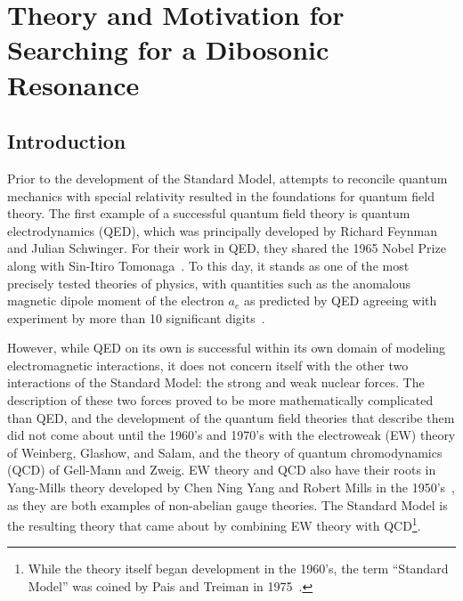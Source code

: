 
\chapter{Theory and Motivation for Searching for a Dibosonic Resonance}
\label{chap:theory}

\section{Introduction}

Prior to the development of the Standard Model, attempts to reconcile quantum mechanics with special relativity resulted in the foundations for quantum field theory.
The first example of a successful quantum field theory is quantum electrodynamics (QED), which was principally developed by Richard Feynman and Julian Schwinger.
For their work in QED, they shared the 1965 Nobel Prize along with Sin-Itiro Tomonaga~\cite{NobelPrize:1965-Physics}.
To this day, it stands as one of the most precisely tested theories of physics, with quantities such as the anomalous magnetic dipole moment of the electron $a_e$ as predicted by QED agreeing with experiment by more than 10 significant digits~\cite{Aoyama_2015}.

However, while QED on its own is successful within its own domain of modeling electromagnetic interactions, it does not concern itself with the other two interactions of the Standard Model: the strong and weak nuclear forces.
The description of these two forces proved to be more mathematically complicated than QED, and the development of the quantum field theories that describe them did not come about until the 1960's and 1970's with the electroweak (EW) theory of Weinberg, Glashow, and Salam, and the theory of quantum chromodynamics (QCD) of Gell-Mann and Zweig.
EW theory and QCD also have their roots in Yang-Mills theory developed by Chen Ning Yang and Robert Mills in the 1950's~\cite{1954PhRv...96..191Y}, as they are both examples of non-abelian gauge theories.
The Standard Model is the resulting theory that came about by combining EW theory with QCD\footnote{While the theory itself began development in the 1960's, the term ``Standard Model'' was coined by Pais and Treiman in 1975~\cite{CaoFieldTheory}.}.

